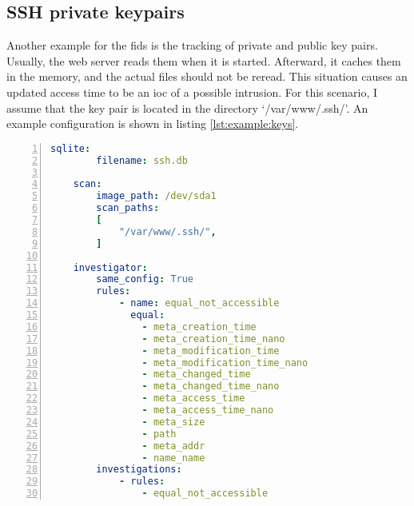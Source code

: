 \subsection{SSH private keypairs}

Another example for the \gls{fids} is the tracking of private and public key pairs. Usually, the web server reads them when it is started. Afterward, it caches them in the memory, and the actual files should not be reread. This situation causes an updated access time to be an \gls{ioc} of a possible intrusion. For this scenario, I assume that the key pair is located in the directory `/var/www/.ssh/'. An example configuration is shown in listing \ref{lst:example:keys}.

\begin{lstlisting}[language=yaml, numbers=left, caption=Example SSH Keypair Configuration, label=lst:example:keys]
    sqlite:
        filename: ssh.db
        
    scan:
        image_path: /dev/sda1
        scan_paths: 
        [
            "/var/www/.ssh/",
        ]

    investigator:
        same_config: True
        rules: 
            - name: equal_not_accessible
              equal:
                - meta_creation_time
                - meta_creation_time_nano
                - meta_modification_time
                - meta_modification_time_nano
                - meta_changed_time
                - meta_changed_time_nano
                - meta_access_time
                - meta_access_time_nano
                - meta_size
                - path
                - meta_addr
                - name_name
        investigations:
            - rules:
                - equal_not_accessible

\end{lstlisting}

